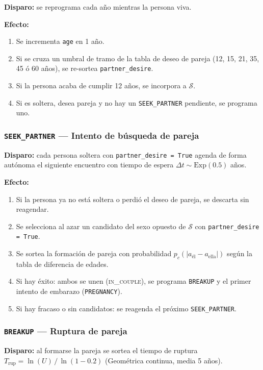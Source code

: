 \documentclass[12pt, a4paper]{article}
\newcommand{\Exp}[1]{\mathrm{Exp}\!\left(#1\right)}
\newcommand{\code}[1]{\texttt{#1}}
\begin{document}
\textbf{Disparo:} se reprograma cada año mientras la persona viva.

\textbf{Efecto:}
\begin{enumerate}
  \item Se incrementa \code{age} en 1 año.
  \item Si se cruza un umbral de tramo de la tabla de deseo de pareja
        (12, 15, 21, 35, 45 ó 60 años), se re-sortea \code{partner\_desire}.
  \item Si la persona acaba de cumplir 12 años, se incorpora a $\mathcal{S}$.
  \item Si es soltera, desea pareja y no hay un \code{SEEK\_PARTNER} pendiente,
        se programa uno.
\end{enumerate}

\subsubsection*{\code{SEEK\_PARTNER} — Intento de búsqueda de pareja}

\textbf{Disparo:} cada persona soltera con \code{partner\_desire = True}
agenda de forma autónoma el siguiente encuentro con tiempo de espera
$\Delta t \sim \Exp{0.5}$ años.

\textbf{Efecto:}
\begin{enumerate}
  \item Si la persona ya no está soltera o perdió el deseo de pareja,
        se descarta sin reagendar.
  \item Se selecciona al azar un candidato del sexo opuesto de $\mathcal{S}$
        con \code{partner\_desire = True}.
  \item Se sortea la formación de pareja con probabilidad
        $p_c(|a_\text{él} - a_\text{ella}|)$ según la tabla
        de diferencia de edades.
  \item Si hay éxito: ambos se unen (\textsc{in\_couple}), se programa
        \code{BREAKUP} y el primer intento de embarazo (\code{PREGNANCY}).
  \item Si hay fracaso o sin candidatos: se reagenda el próximo
        \code{SEEK\_PARTNER}.
\end{enumerate}

\subsubsection*{\code{BREAKUP} — Ruptura de pareja}

\textbf{Disparo:} al formarse la pareja se sortea el tiempo de ruptura
$T_\mathrm{rup} = \ln(U)\,/\,\ln(1-0.2)$ (Geométrica continua, media 5 años).
\end{document}
